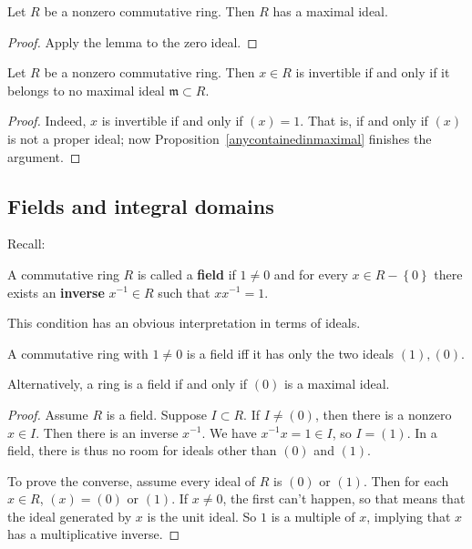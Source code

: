 \begin{corollary} Let $R $ be a nonzero commutative ring. Then $R$ has a
maximal ideal. \end{corollary} \begin{proof} Apply the lemma to the zero ideal.
\end{proof}

\begin{corollary} Let $R$ be a nonzero commutative ring. Then $x \in R$ is
invertible if and only if it belongs to no maximal ideal $\mathfrak{m} \subset
R$. \end{corollary} \begin{proof} Indeed, $x$ is invertible if and only if $(x)
= 1$. That is, if and only if $(x)$ is not a proper ideal; now
Proposition~\ref{anycontainedinmaximal} finishes the argument. \end{proof}

\subsection{Fields and integral domains}

Recall:

\begin{definition} A commutative ring $R$ is called a \textbf{field} if $1 \neq
0$ and for every $x \in R - \left\{0\right\}$ there exists an \textbf{inverse}
$x^{-1} \in R$ such that $xx^{-1} = 1$.

\end{definition}

This condition has an obvious interpretation in terms of ideals.
\begin{proposition} A commutative ring with $1 \neq 0$ is a field iff it has
only the two ideals $(1), (0)$. \end{proposition}

Alternatively, a ring is a field if and only if $(0)$ is a maximal ideal.

\begin{proof} Assume $R$ is a field. Suppose $I \subset R$. If $I \neq (0)$,
then there is a nonzero $x \in I$. Then there is an inverse $x^{-1}$. We have
$x^{-1} x =1 \in I$, so $I = (1)$. In a field, there is thus no room for ideals
other than $(0)$ and $(1)$.

To prove the converse, assume every ideal of $R$ is $(0)$ or $(1)$. Then for
each $x \in R$, $(x) = (0)$ or $(1)$. If $x \neq 0$, the first can't happen, so
that means that the ideal generated by $x$ is the unit ideal. So $1$ is a
multiple of $x$, implying that $x$ has a multiplicative inverse. \end{proof}

